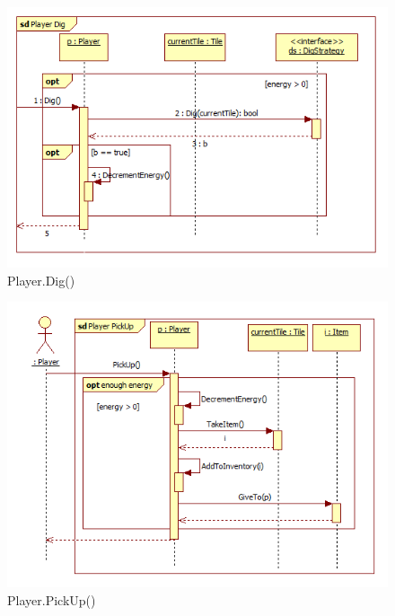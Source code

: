 \begin{figure}[H]
	\begin{center}
		\includegraphics[width=15cm]{chapters/chapter04/seqdiag/Player_Dig.png}
		\caption{Player.Dig()}
		\label{fig:PlayerDig}
	\end{center}
\end{figure}
\begin{figure}[H]
	\begin{center}
		\includegraphics[width=15cm]{chapters/chapter04/seqdiag/Player_PickUp.png}
		\caption{Player.PickUp()}
		\label{fig:PlayerPickUp}
	\end{center}
\end{figure}
